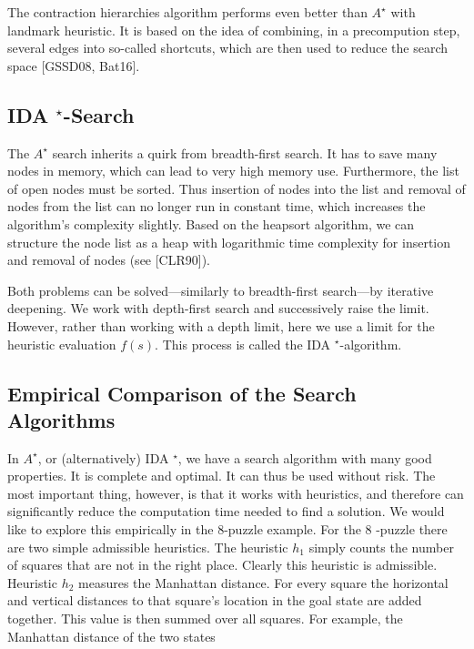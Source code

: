 \documentclass[10pt]{book}
\begin{document}
The contraction hierarchies algorithm performs even better than $A^{\star}$ with landmark heuristic. It is based on the idea of combining, in a precompution step, several edges into so-called shortcuts, which are then used to reduce the search space [GSSD08, Bat16].

\subsection{IDA $^{\star}$-Search}
The $A^{\star}$ search inherits a quirk from breadth-first search. It has to save many nodes in memory, which can lead to very high memory use. Furthermore, the list of open nodes must be sorted. Thus insertion of nodes into the list and removal of nodes from the list can no longer run in constant time, which increases the algorithm's complexity slightly. Based on the heapsort algorithm, we can structure the node list as a heap with logarithmic time complexity for insertion and removal of nodes (see [CLR90]).

Both problems can be solved—similarly to breadth-first search—by iterative deepening. We work with depth-first search and successively raise the limit. However, rather than working with a depth limit, here we use a limit for the heuristic evaluation $f(s)$. This process is called the IDA $^{\star}$-algorithm.

\subsection{Empirical Comparison of the Search Algorithms}
In $A^{\star}$, or (alternatively) IDA $^{\star}$, we have a search algorithm with many good properties. It is complete and optimal. It can thus be used without risk. The most important thing, however, is that it works with heuristics, and therefore can significantly reduce the computation time needed to find a solution. We would like to explore this empirically in the 8-puzzle example.
For the 8 -puzzle there are two simple admissible heuristics. The heuristic $h_{1}$ simply counts the number of squares that are not in the right place. Clearly this heuristic is admissible. Heuristic $h_{2}$ measures the Manhattan distance. For every square the horizontal and vertical distances to that square's location in the goal state are added together. This value is then summed over all squares. For example, the Manhattan distance of the two states
\end{document}
